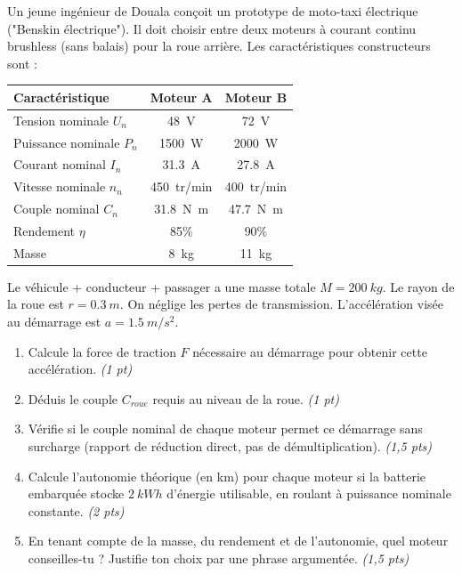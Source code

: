 \documentclass[11pt]{article}
\begin{document}
\begin{exercice}
Un jeune ingénieur de Douala conçoit un prototype de moto-taxi électrique ("Benskin électrique"). Il doit choisir entre deux moteurs à courant continu brushless (sans balais) pour la roue arrière. Les caractéristiques constructeurs sont :

\begin{center}
\begin{tabular}{|l|c|c|}
\hline
\textbf{Caractéristique} & \textbf{Moteur A} & \textbf{Moteur B} \\
\hline
Tension nominale $U_n$ & \SI{48}{V} & \SI{72}{V} \\
Puissance nominale $P_n$ & \SI{1500}{W} & \SI{2000}{W} \\
Courant nominal $I_n$ & \SI{31,3}{A} & \SI{27,8}{A} \\
Vitesse nominale $n_n$ & \SI{450}{tr/min} & \SI{400}{tr/min} \\
Couple nominal $C_n$ & \SI{31,8}{N.m} & \SI{47,7}{N.m} \\
Rendement $\eta$ & 85\% & 90\% \\
Masse & \SI{8}{kg} & \SI{11}{kg} \\
\hline
\end{tabular}
\end{center}
Le véhicule + conducteur + passager a une masse totale $M = \SI{200}{kg}$. Le rayon de la roue est $r = \SI{0,3}{m}$. On néglige les pertes de transmission. L'accélération visée au démarrage est $a = \SI{1,5}{m/s^2}$.

\begin{enumerate}
    \item Calcule la force de traction $F$ nécessaire au démarrage pour obtenir cette accélération. \textit{(1 pt)}
    \item Déduis le couple $C_{roue}$ requis au niveau de la roue. \textit{(1 pt)}
    \item Vérifie si le couple nominal de chaque moteur permet ce démarrage sans surcharge (rapport de réduction direct, pas de démultiplication). \textit{(1,5 pts)}
    \item Calcule l'autonomie théorique (en km) pour chaque moteur si la batterie embarquée stocke $\SI{2}{kWh}$ d'énergie utilisable, en roulant à puissance nominale constante. \textit{(2 pts)}
    \item En tenant compte de la masse, du rendement et de l'autonomie, quel moteur conseilles-tu ? Justifie ton choix par une phrase argumentée. \textit{(1,5 pts)}
\end{enumerate}
\end{exercice}
\end{document}
